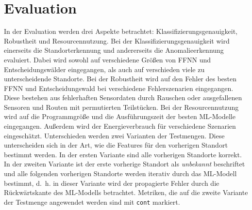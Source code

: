 \chapter{Evaluation}
In der Evaluation werden drei Aspekte betrachtet: Klassifizierungsgenauigkeit, Robustheit und Resourcennutzung.
Bei der Klassifizierungsgenauigkeit wird einerseits die Standorterkennung und andererseits die Anomalieerkennung evaluiert.
Dabei wird sowohl auf verschiedene Größen von FFNN und Entscheidungswälder eingegangen,
als auch auf verschieden viele zu unterscheidende Standorte.
\newline
\newline
Bei der Robustheit wird auf den Fehler des besten FFNN und Entscheidungswald bei verschiedene Fehlerszenarien eingegangen.
Diese bestehen aus fehlerhaften Sensordaten durch Rauschen oder ausgefallenen Sensoren und Routen mit permutierten Teilstücken.
\newline
\newline
Bei der Resourcennutzung wird auf die Programmgröße und die Ausführungszeit der besten ML-Modelle eingegangen.
Außerdem wird der Energieverbrauch für verschiedene Szenarien eingeschätzt.
\newline
\newline
Unterschieden werden zwei Varianten der Testmengen.
Diese unterscheiden sich in der Art, wie die Features für den vorherigen Standort bestimmt werden.
In der ersten Variante sind alle vorherigen Standorte korrekt.
In der zweiten Variante ist der erste vorherige Standort als \textit{unbekannt} beschriftet und alle folgenden vorherigen Standorte werden iterativ durch das ML-Modell bestimmt,
d.~h. in dieser Variante wird der propagierte Fehler durch die Rückwärtskante des ML-Modells betrachtet.
Metriken, die auf die zweite Variante der Testmenge angewendet werden sind mit \texttt{cont} markiert.










